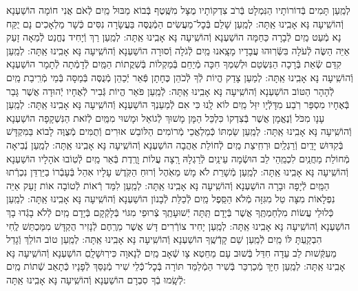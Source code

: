 \documentclass[twoside, openany, parskip=half, 11pt]{book}
\begin{document}
\begin{sometimes}
\begin{small}
לְמַֽעַן תָּמִים בְּֿדוֹרוֹתָיו הַנִּמְלָט בְּֿרֹב צִדְקוֹתָיו
 מֻצָּל מִשֶּֽׁטֶף בְּֿבוֹא מַבּוּל מַֽיִם לְֿאֹם אֲנִי חוֹמָה הוֹשַׁעְנָא וְֿהוֹשִֽׁיעָה נָּא אָבִֽינוּ אַֽתָּה:
לְמַֽעַן שָׁלֵם בְּֿכׇל־מַעֲשִׂים הַמְֿנֻסֶּה בַּעֲשָׂרָה נִסִּים
 כְּֿשָׁר מַלְאָכִים נָם יֻקַּח נָא מְֿעַט מַֽיִם לְֿבָרָה כַּחַמָּה הוֹשַׁעְנָא וְֿהוֹשִֽׁיעָה נָּא אָבִֽינוּ אַֽתָּה:
לְמַֽעַן רַךְ וְֿיָחִיד נֶחֱנַט לְֿמֵאָה זָעַק אַיֵּה הַשֶּׂה לְֿעֹלָה
 בִּשְּֿׂרֽוּהוּ עֲבָדָיו מָצָֽאנוּ מַֽיִם לְֿגֹלָה וְֿסוּרָה הוֹשַׁעְנָא וְֿהוֹשִֽׁיעָה נָּא אָבִֽינוּ אַֽתָּה:
לְמַֽעַן קִדַּם שְֿׂאֵת בְּֿרָכָה הַנִּשְׂטַם וּלְשִׁמְךָ חִכָּה
 מְֿיַחֵם בְּֿמַקְלוֹת בְּֿשִׁקֲתוֹת הַמַּֽיִם לְֿדָמְֿתָה לְֿתָמָר הוֹשַׁעְנָא וְֿהוֹשִֽׁיעָה נָּא אָבִֽינוּ אַֽתָּה:
לְמַעַן צָדַק הֱיוֹת לְֿךָ לְֿכֹהֵן כֶּחָתָן פְּֿאֵר יְֿכַהֵן
 מְֿנֻסֶּה בְּֿמַסָּה בְּֿמֵי מְֿרִֽיבַת מַֽיִם לְֿהָהָר הַטּוֹב הוֹשַׁעְנָא וְֿהוֹשִֽׁיעָה נָּא אָבִֽינוּ אַֽתָּה:
 לְֿמַֽעַן פֹּאַר הֱיוֹת גְּֿבִיר לְֿאֶחָיו יְֿהוּדָה אֲשֶׁר גָּבַר בְּֿאֶחָיו
 מִסְפַּר רֹֽבַע מִדָּלְֿיָו יִזַּל מַֽיִם לוֹא לָֽנוּ כִּי אִם לְֿמַעַנְךָ הוֹשַׁעְנָא וְֿהוֹשִֽׁיעָה נָּא אָבִֽינוּ אַֽתָּה:
לְמַֽעַן עָנָו מִכֹּל וְֿנֶאֱמָן אֲשֶׁר בְּֿצִדְקוֹ כִּלְכֵּל הַמָּן
 מָשׁוּךְ לְֿגוֹאֵל וּמָשׁוּי מִמַּֽיִם לְֿזֹאת הַנִּשְׁקָפָה הוֹשַׁעְנָא וְֿהוֹשִֽׁיעָה נָּא אָבִֽינוּ אַֽתָּה:
לְמַֽעַן שַׂמְתּוֹ כְּֿמַלְאֲכֵי מְֿרוֹמִים הַלּוֹבֵשׁ אוּרִים וְֿתֻמִּים
 מְֿצֻוֶּה לָבוֹא בַּמִּקְדָּשׁ בְּֿקִדּוּשׁ יָדַֽיִם וְֿרַגְלַֽיִם וּרְחִֽיצַת מַֽיִם
 לְֿחוֹלַת אַהֲבָה הוֹשַׁעְנָא וְֿהוֹשִֽׁיעָה נָּא אָבִֽינוּ אַֽתָּה:
לְמַֽעַן נְֿבִיאָה מְֿחוֹלַת מַחֲנַֽיִם לִכְמֵֽהֵי לֵב הוּשְֿׂמָה עֵינַֽיִם
 לְֿרַגְלָהּ רָֽצָה עֲלוֹת וָרֶֽדֶת בְּֿאֵר מַֽיִם לְֿטֽוֹבוּ אֹהָלָיו הוֹשַׁעְנָא וְֿהוֹשִֽׁיעָה נָּא אָבִֽינוּ אַֽתָּה:
לְמַֽעַן מְֿשָׁרֵת לֹא מָשׁ מֵאֹֽהֶל וְֿרוּחַ הַקֹּֽדֶשׁ עָלָיו אִהֵל
 בְּֿעָבְֿרוֹ בַיַּרְדֵּן נִכְרְֿתוּ הַמַּֽיִם לְֿיָפָה וּבָרָה הוֹשַׁעְנָא וְֿהוֹשִֽׁיעָה נָּא אָבִֽינוּ אַֽתָּה:
לְמַֽעַן לִמַּד רְֿאוֹת לְֿטוֹבָה אוֹת זָעַק אַיֵּה נִפְלָאוֹת
 מִצָּה טַל מִגִּזָּה מְֿלֹא הַסֵּֽפֶל מַֽיִם לְֿכַלַּת לְֿבָנוֹן הוֹשַׁעְנָא וְֿהוֹשִֽׁיעָה נָּא אָבִֽינוּ אַֽתָּה:
לְמַֽעַן כְּֿלוּלֵי עֲשׂוֹת מִלְחַמְתֶּֽךָ אֲשֶׁר בְּֿיָדָם תַּֽתָּה יְֿשׁוּעָתֶֽךָ
 צְֿרוּפֵי מִגּוֹי בְּֿלָקְֿקָם בְּֿיָדָם מַֽיִם לְֿלֹא בָגְֿדוּ בָךְ הוֹשַׁעְנָא וְֿהוֹשִֽׁיעָה נָּא אָבִֽינוּ אַֽתָּה:
לְמַֽעַן יָחִיד צוֹרְֿרִים דָּשׁ אֲשֶׁר מֵרֶֽחֶם לְֿנָזִיר הֻקְדָּשׁ
 מִמַּכְתֵּשׁ לֶֽחִי הִבְקַֽעְתָּ לּוֹ מַֽיִם לְֿמַֽעַן שֵׁם קָדְֿשֶֽׁךָ הוֹשַׁעְנָא וְֿהוֹשִֽׁיעָה נָּא אָבִֽינוּ אַֽתָּה:
לְמַֽעַן טוֹב הוֹלֵךְ וְֿגָדֵל מֵעִקְּֿשׁוּת לֵב עֵדָה חִדֵּל
 בְּֿשׁוּב עָם מֵחֵטְא צָו שְֿׁאָב מַֽיִם לְֿנָאוָה כִּירֽוּשָׁלָֽםִ הוֹשַׁעְנָא וְֿהוֹשִֽׁיעָה נָּא אָבִֽינוּ אַֽתָּה:
לְמַֽעַן חַיָּךְ מְֿכַרְכֵּר בְּֿשִׁיר הַמְֿלַמֵּד תּוֹרָה בְּֿכׇל־כְּֿֿלֵי שִׁיר
 מְֿנַסֵּךְ לְֿפָנָיו כְּֿתָאַב שְֿׁתוֹת מַֽיִם לְֿשָֽׂמוּ בְֿךָ סִבְרָם הוֹשַׁעְנָא וְֿהוֹשִֽׁיעָה נָּא אָבִֽינוּ אַֽתָּה:

\end{small}
\end{sometimes}
\end{document}
